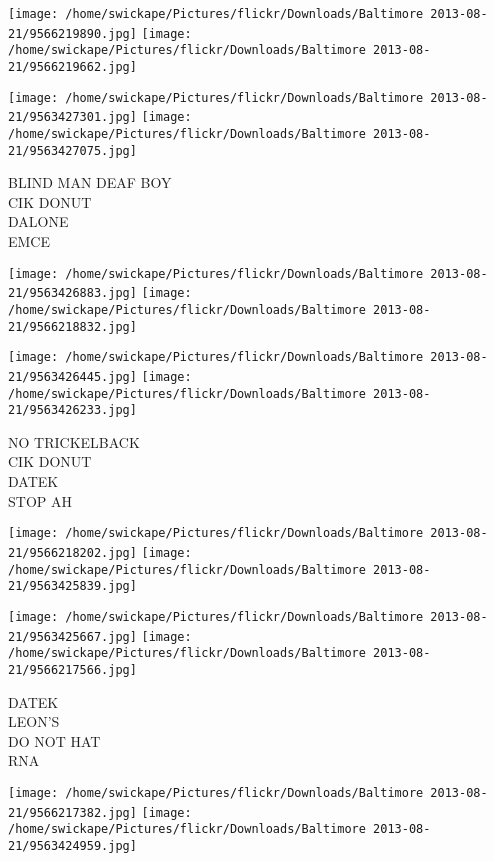 \documentclass[10pt,letterpaper]{article}
\begin{document}
\texttt{[image: /home/swickape/Pictures/flickr/Downloads/Baltimore 2013-08-21/9566219890.jpg]}
\texttt{[image: /home/swickape/Pictures/flickr/Downloads/Baltimore 2013-08-21/9566219662.jpg]}

\texttt{[image: /home/swickape/Pictures/flickr/Downloads/Baltimore 2013-08-21/9563427301.jpg]}
\texttt{[image: /home/swickape/Pictures/flickr/Downloads/Baltimore 2013-08-21/9563427075.jpg]}

BLIND MAN DEAF BOY\\
CIK DONUT\\
DALONE\\
EMCE\\
\pagebreak

\texttt{[image: /home/swickape/Pictures/flickr/Downloads/Baltimore 2013-08-21/9563426883.jpg]}
\texttt{[image: /home/swickape/Pictures/flickr/Downloads/Baltimore 2013-08-21/9566218832.jpg]}

\texttt{[image: /home/swickape/Pictures/flickr/Downloads/Baltimore 2013-08-21/9563426445.jpg]}
\texttt{[image: /home/swickape/Pictures/flickr/Downloads/Baltimore 2013-08-21/9563426233.jpg]}

NO TRICKELBACK\\
CIK DONUT\\
DATEK\\
STOP AH\\
\pagebreak

\texttt{[image: /home/swickape/Pictures/flickr/Downloads/Baltimore 2013-08-21/9566218202.jpg]}
\texttt{[image: /home/swickape/Pictures/flickr/Downloads/Baltimore 2013-08-21/9563425839.jpg]}

\texttt{[image: /home/swickape/Pictures/flickr/Downloads/Baltimore 2013-08-21/9563425667.jpg]}
\texttt{[image: /home/swickape/Pictures/flickr/Downloads/Baltimore 2013-08-21/9566217566.jpg]}

DATEK\\
LEON'S\\
DO NOT HAT\\
RNA\\
\pagebreak

\texttt{[image: /home/swickape/Pictures/flickr/Downloads/Baltimore 2013-08-21/9566217382.jpg]}
\texttt{[image: /home/swickape/Pictures/flickr/Downloads/Baltimore 2013-08-21/9563424959.jpg]}
\end{document}
